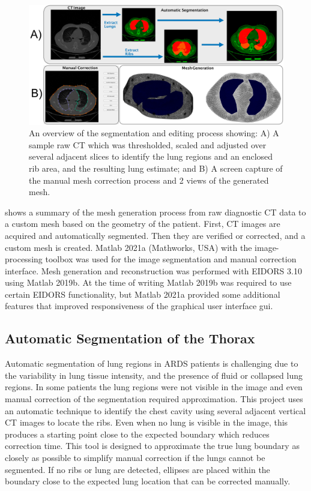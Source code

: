 \begin{figure}[H]
	\centering
	\includegraphics[width=\textwidth]{chapter5-CT_to_mesh/imgs/methods_figure.pdf}
	\caption[Mesh generation method overiew.]{\label{fig:segment_overview}%
	An overview of the segmentation and editing process showing: 
	A) A sample raw CT which was thresholded, scaled and adjusted over several 
	adjacent slices to identify
	the lung regions and an enclosed rib area, and the resulting lung estimate; and
	B) A screen  capture of the manual mesh correction process and 2 views of the generated
	mesh.
	}
\end{figure}

 shows a summary of the mesh generation process from raw diagnostic CT 
data to a custom mesh based on the geometry of the patient.
First, CT images are acquired and automatically segmented. Then they are verified or corrected, and a custom mesh is created.
Matlab 2021a (Mathworks, USA) with the 
image-processing toolbox was used for the image segmentation and manual correction interface.
Mesh generation and reconstruction was performed with 
EIDORS 3.10~\parencite{adler_eidors_2017} using Matlab 2019b.
At the time of writing Matlab 2019b was required to 
use certain EIDORS functionality, but Matlab 2021a provided some additional 
features that improved responsiveness of the 
graphical user interface \acrshort{gui}.

\subsection{Automatic Segmentation of the Thorax} \label{sec:auto-segment}
Automatic segmentation of lung regions in ARDS patients is challenging due to the variability
in lung tissue intensity, and the presence of fluid or collapsed lung regions. 
In some patients the lung regions were not visible in the image and even manual
correction of the segmentation required approximation. 
This project uses an automatic technique to identify the chest cavity using several adjacent vertical CT images to
locate the ribs.
Even when no lung is visible in the image, this produces a starting point
close to the expected boundary which reduces correction time. 
This tool is designed to approximate the true lung boundary as closely as possible to 
simplify manual correction if the lungs cannot be segmented.
If no ribs or lung are detected, ellipses are placed within the boundary 
close to the expected lung location that 
can be corrected manually.

